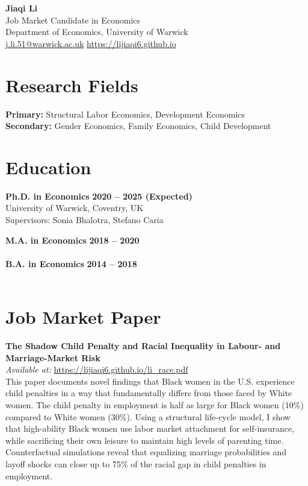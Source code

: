 \documentclass[11pt,a4paper]{article}
\begin{document}
\begin{center}
    {\Huge \textbf{Jiaqi Li}} \\[0.2cm]
    {\large Job Market Candidate in Economics} \\[0.1cm]
    Department of Economics, University of Warwick \\[0.2cm]
    
    \href{mailto:j.li.51@warwick.ac.uk}{j.li.51@warwick.ac.uk} \quad
    \href{https://lijiaqi6.github.io}{https://lijiaqi6.github.io} \\[0.3cm]
\end{center}

\section{Research Fields}
\textbf{Primary:} Structural Labor Economics, Development Economics \\
\textbf{Secondary:} Gender Economics, Family Economics, Child Development

\section{Education}
\textbf{Ph.D. in Economics} \hfill \textbf{2020 -- 2025 (Expected)} \\
University of Warwick, Coventry, UK \\
Supervisors: Sonia Bhalotra, Stefano Caria

\textbf{M.A. in Economics} \hfill \textbf{2018 -- 2020} \\
[Your Master's University] \\

\textbf{B.A. in Economics} \hfill \textbf{2014 -- 2018} \\
[Your Bachelor's University] \\

\section{Job Market Paper}
\textbf{The Shadow Child Penalty and Racial Inequality in Labour- and Marriage-Market Risk} \\
\textit{Available at:} \href{https://lijiaqi6.github.io/li_race.pdf}{https://lijiaqi6.github.io/li\_race.pdf} \\

This paper documents novel findings that Black women in the U.S. experience child penalties in a way that fundamentally differs from those faced by White women. The child penalty in employment is half as large for Black women (10\%) compared to White women (30\%). Using a structural life-cycle model, I show that high-ability Black women use labor market attachment for self-insurance, while sacrificing their own leisure to maintain high levels of parenting time. Counterfactual simulations reveal that equalizing marriage probabilities and layoff shocks can close up to 75\% of the racial gap in child penalties in employment.
\end{document}
